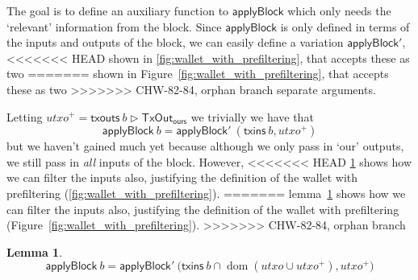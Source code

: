 \documentclass{article}
\newcommand{\restrictrange}{\rhd}
\DeclareMathOperator{\dom}{dom}
\theoremstyle{definition}{
  \newtheorem{lemma}{Lemma}[section] %
  \newtheorem{definition}[lemma]{Definition}
}
\theoremstyle{theorem}{
  \newtheorem{invariant}[lemma]{Invariant}
  \newtheorem{proofobligation}[lemma]{Proof Obligation}
}
\newtheorem{lemma}{Lemma}[section] %
\numberwithin{equation}{lemma}
\begin{document}
The goal is to define an auxiliary function to $\mathsf{applyBlock}$ which only
needs the `relevant' information from the block. Since
$\mathsf{applyBlock}$ is only defined in terms of the inputs and outputs
of the block, we can easily define a variation $\mathsf{applyBlock}'$,
<<<<<<< HEAD
shown in \cref{fig:wallet_with_prefiltering}, that accepts these as two
=======
shown in Figure~\ref{fig:wallet_with_prefiltering}, that accepts these as two
>>>>>>> CHW-82-84, orphan branch
separate arguments.

Letting
%
\begin{math}
\mathit{utxo}^+ = \mathsf{txouts} ~ b \restrictrange \mathsf{TxOut_{ours}}
\end{math}
%
we trivially we have that
%
\begin{equation*}
  \mathsf{applyBlock} ~ b
= \mathsf{applyBlock}' ~ (\mathsf{txins} ~ b, \mathit{utxo}^+)
\end{equation*}
%
but we haven't gained much yet because although we only pass in `our' outputs,
we still pass in \emph{all} inputs of the block.  However,
<<<<<<< HEAD
\cref{lem:prefiltering} shows how we can filter the inputs also, justifying
the definition of the wallet with prefiltering
(\cref{fig:wallet_with_prefiltering}).
=======
lemma~\ref{lem:prefiltering} shows how we can filter the inputs also, justifying
the definition of the wallet with prefiltering
(Figure~\ref{fig:wallet_with_prefiltering}).
>>>>>>> CHW-82-84, orphan branch

\begin{lemma}
\begin{equation*}
  \mathsf{applyBlock} ~ b
= \mathsf{applyBlock}' ~ \Big( \mathsf{txins} ~ b \cap \dom (\mathit{utxo} \cup \mathit{utxo}^+), \mathit{utxo}^+ \Bigr)
\end{equation*}
\label{lem:prefiltering}
\end{lemma}
\end{document}
